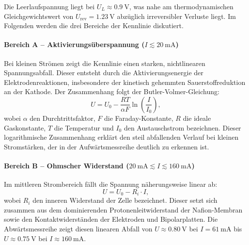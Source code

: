 \documentclass[11pt,a4paper]{article}
\numberwithin{equation}{section}
\begin{document}
\noindent Die Leerlaufspannung liegt bei $U_L \approx \SI{0.9}{\volt}$, was nahe am thermodynamischen Gleichgewichtswert von $U_{\text{rev}} = \SI{1.23}{\volt}$ abzüglich irreversibler Verluste liegt. Im Folgenden werden die drei Bereiche der Kennlinie diskutiert.

\paragraph{Bereich A -- Aktivierungsüberspannung ($I \lesssim \SI{20}{\milli\ampere}$)}
Bei kleinen Strömen zeigt die Kennlinie einen starken, nichtlinearen Spannungsabfall. Dieser entsteht durch die Aktivierungsenergie der Elektrodenreaktionen, insbesondere der kinetisch gehemmten Sauerstoffreduktion an der Kathode. Der Zusammenhang folgt der Butler-Volmer-Gleichung:
\begin{equation}
    U = U_0 - \frac{RT}{\alpha F} \ln\!\left(\frac{I}{I_0}\right),
    \label{eq:butler_volmer}
\end{equation}
\noindent wobei $\alpha$ den Durchtrittsfaktor, $F$ die Faraday-Konstante, $R$ die ideale Gaskonstante, $T$ die Temperatur und $I_0$ den Austauschstrom bezeichnen. Dieser logarithmische Zusammenhang erklärt den steil abfallenden Verlauf bei kleinen Stromstärken, der in der Aufwärtsmessreihe deutlich zu erkennen ist.

\paragraph{Bereich B -- Ohmscher Widerstand ($\SI{20}{\milli\ampere} \lesssim I \lesssim \SI{160}{\milli\ampere}$)}
Im mittleren Strombereich fällt die Spannung näherungsweise linear ab:
\begin{equation}
    U = U_0 - R_i \cdot I,
    \label{eq:ohmsch}
\end{equation}
\noindent wobei $R_i$ den inneren Widerstand der Zelle bezeichnet. Dieser setzt sich zusammen aus dem dominierenden Protonenleitwiderstand der Nafion-Membran sowie den Kontaktwiderständen der Elektroden und Bipolarplatten. Die Abwärtsmessreihe zeigt diesen linearen Abfall von $U \approx \SI{0.80}{\volt}$ bei $I = \SI{61}{\milli\ampere}$ bis $U \approx \SI{0.75}{\volt}$ bei $I \approx \SI{160}{\milli\ampere}$.
\end{document}
